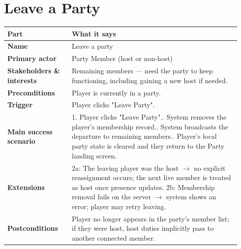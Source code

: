\documentclass[11pt,twocolumn]{article}
\newcommand{\ucheader}{%
\textbf{Part} & \textbf{What it says} \\
\hline
\endhead
\hline
\endfoot
}
\begin{document}
\section{Leave a Party}
{\footnotesize
\begin{longtable}{@{}p{0.26\linewidth}p{0.68\linewidth}@{}}
\hline
\ucheader
\textbf{Name} & Leave a party \\
\hline
\textbf{Primary actor} & Party Member (host or non-host) \\
\hline
\textbf{Stakeholders \& interests} & Remaining members --- need the party to keep functioning, including gaining a new host if needed. \\
\hline
\textbf{Preconditions} & Player is currently in a party. \\
\hline
\textbf{Trigger} & Player clicks "Leave Party". \\
\hline
\textbf{Main success scenario} & 1. Player clicks "Leave Party".\newline
2. System removes the player's membership record.\newline
3. System broadcasts the departure to remaining members.\newline
4. Player's local party state is cleared and they return to the Party landing screen. \\
\hline
\textbf{Extensions} & 2a: The leaving player was the host $\rightarrow$ no explicit reassignment occurs; the next live member is treated as host once presence updates.\newline
2b: Membership removal fails on the server $\rightarrow$ system shows an error; player may retry leaving. \\
\hline
\textbf{Postconditions} & Player no longer appears in the party's member list; if they were host, host duties implicitly pass to another connected member. \\
\hline
\end{longtable}
}
\end{document}
